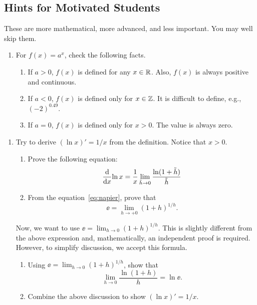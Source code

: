 \documentclass[11pt,pdfa,lastpage]{MishoNote}
\newcommand\starskip{\bigskip\begin{center}\pgfornament[width=7cm]{88}\end{center}\medskip}
\begin{document}
\newpage
\subsection{Hints for Motivated Students}
These are more mathematical, more advanced, and less important. You may well skip them.

\starskip

\begin{enumerate}[resume]
  \item For $f(x)=a^x$, check the following facts.
  \begin{enumerate}
    \item If $a>0$, $f(x)$ is defined for any $x\in{\mathbb{R}}$. Also, $f(x)$ is always positive and continuous.
    \item If $a<0$, $f(x)$ is defined only for $x\in{\mathbb{Z}}$. It is difficult to define, e.g., $(-2)^{0.49}$.
    \item If $a=0$, $f(x)$ is defined only for $x>0$. The value is always zero.
  \end{enumerate}
\end{enumerate}
  \OutputNote
\begin{enumerate}[resume]
  \item Try to derive $(\ln x)'=1/x$ from the definition. Notice that $x>0$.
  \begin{enumerate}
    \item Prove the following equation: 
     \[\diff{}x{\ln x}=\frac{1}{x}\lim_{\tilde h\to 0}\frac{\ln(1+\tilde h)}{\tilde h}\]
    \item From the equation~\eqref{eq:napier}, prove that
    \[\ee=\lim_{h\to+0}(1+h)^{1/h}.\]
  \end{enumerate}
  Now, we want to use $\ee=\lim_{h\to0}(1+h)^{1/h}$. This is slightly different from the above expression and, mathematically, an independent proof is required.
  However, to simplify discussion, we accept this formula.
  \begin{enumerate}[resume]
    \item Using $\ee=\lim_{h\to0}(1+h)^{1/h}$, show that
    \[
      \lim_{h\to 0}\frac{\ln(1+h)}{h}=\ln\ee.
    \]
    \item Combine the above discussion to show $(\ln x)'=1/x$.
  \end{enumerate}

\end{enumerate}
\end{document}
